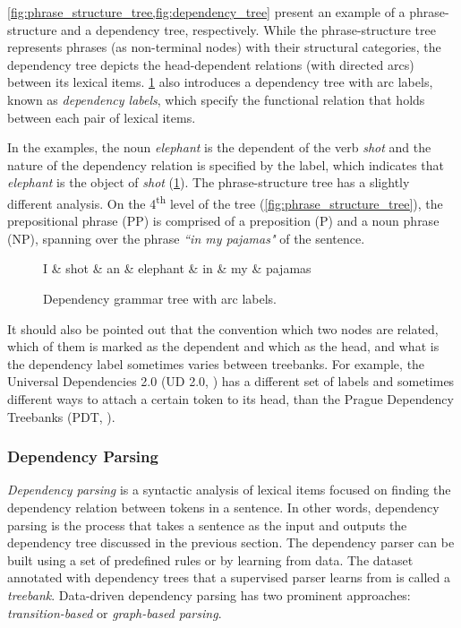 \cref{fig:phrase_structure_tree,fig:dependency_tree} present an example of a phrase-structure and a dependency tree, respectively.
While the phrase-structure tree represents phrases (as non-terminal nodes) with their structural categories, the dependency tree depicts the head-dependent relations (with directed arcs) between its lexical items.
\cref{fig:dependency_tree_label} also introduces a dependency tree with arc labels, known as \textit{dependency labels}, which specify the functional relation that holds between each pair of lexical items.

In the examples, the noun \textit{elephant} is the dependent of the verb \textit{shot} and the nature of the dependency relation is specified by the label, which indicates that \textit{elephant} is the object of \textit{shot} (\cref{fig:dependency_tree_label}). The phrase-structure tree has a slightly different analysis.
On the 4\textsuperscript{th} level of the tree (\cref{fig:phrase_structure_tree}), the prepositional phrase (PP) is comprised of a preposition (P) and a noun phrase (NP), spanning over the phrase \textit{``in my pajamas"} of the sentence.

\begin{figure}[t]
    \centering
    \begin{dependency}
        \begin{deptext}
        I \& shot \& an \& elephant \& in \& my \& pajamas \\
        \end{deptext}
    \end{dependency}
    \caption{Dependency grammar tree with arc labels.}
    \label{fig:dependency_tree_label}
\end{figure}

It should also be pointed out that the convention which two nodes are related, which of them is marked as the dependent and which as the head, and what is the dependency label sometimes varies between treebanks.
For example, the Universal Dependencies 2.0 (UD 2.0, \cite{UD20}) has a different set of labels and sometimes different ways to attach a certain token to its head, than the Prague Dependency Treebanks (PDT, \cite{pdt20:2006}).

\subsubsection{Dependency Parsing}
\label{the-ling-dep-parse}
\textit{Dependency parsing} is a syntactic analysis of lexical items focused on finding the dependency relation between tokens in a sentence.
In other words, dependency parsing is the process that takes a sentence as the input and outputs the dependency tree discussed in the previous section.
The dependency parser can be built using a set of predefined rules or by learning from data.
The dataset annotated with dependency trees that a supervised parser learns from is called a \textit{treebank}.
Data-driven dependency parsing has two prominent approaches: \textit{transition-based} or \textit{graph-based parsing}.

